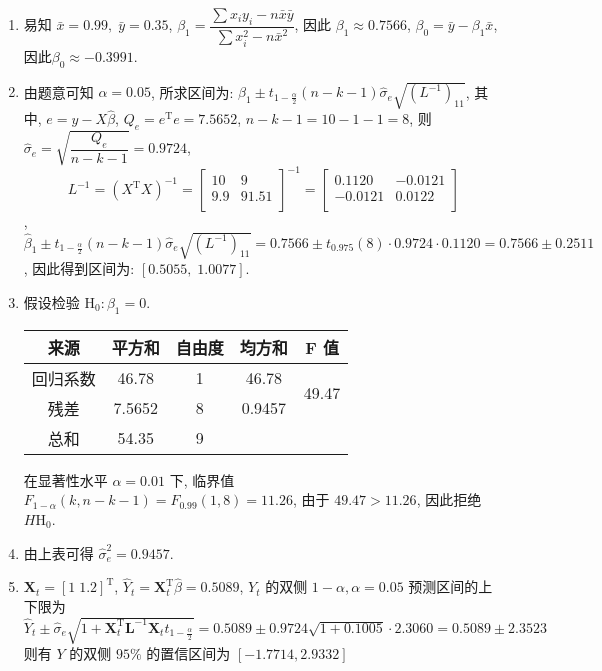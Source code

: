 \begin{enumerate}[(1)]
    \item 易知 $\bar{x}=0.99,\;\bar{y}=0.35$, $\beta_1=\dfrac{\sum x_iy_i-n\bar{x}\bar{y}}{\sum x_i^2-n\bar{x}^2}$, 因此 $\beta_1\approx 0.7566$, $\beta_0=\bar{y}-\beta_1\bar{x}$, 因此$\beta_0\approx -0.3991$.
    
    \item 由题意可知 $\alpha=0.05$, 所求区间为: $\beta_1\pm t_{1-\frac{\alpha}{2}}(n-k-1)\hat{\sigma}_e\sqrt{(L^{-1})_{11}}$, 其中, $e=y-X\hat{\beta}$, $Q_e=e^{\text{T}}e=7.5652$, $n-k-1=10-1-1=8$, 则 $\hat{\sigma}_{e}=\sqrt{\dfrac{Q_e}{n-k-1}}=0.9724$,
    $$
    L^{-1}=(X^{\text{T}}X)^{-1}=\begin{bmatrix}
        10&9\\
        9.9&91.51\\
    \end{bmatrix}^{-1}=\begin{bmatrix}
        0.1120&-0.0121\\
        -0.0121&0.0122\\
    \end{bmatrix}
    $$, $\hat{\beta}_1\pm t_{1-\frac{\alpha}{2}}(n-k-1)\hat{\sigma}_e\sqrt{(L^{-1})_{11}}=0.7566\pm t_{0.975}(8)\cdot 0.9724\cdot 0.1120=0.7566\pm0.2511$,
    因此得到区间为: $[0.5055,\;1.0077]$.
    \item 假设检验 $\text{H}_0:\beta_1=0$.
    
    \begin{center}
    \begin{tabular}{c|c|c|cc}
        \hline
        来源&平方和& 自由度 & \multicolumn{1}{c|}{均方和}   & F 值\\ \hline
        回归系数 & 46.78  & 1   & \multicolumn{1}{c|}{46.78}  & \multirow{2}{*}{49.47} \\
        残差   & 7.5652 & 8  & \multicolumn{1}{c|}{0.9457} &\\ \hline
        总和   & 54.35  & 9  &&\\ \hline
    \end{tabular}
    \end{center}

    在显著性水平 $\alpha=0.01$ 下, 临界值 $F_{1-\alpha}(k,n-k-1)=F_{0.99}(1,8)=11.26$, 由于 $49.47>11.26$, 因此拒绝 $H\text{H}_0$.
    \item 由上表可得 $\hat{\sigma}_e^2=0.9457$.
    \item $\textbf{X}_t=[1\;1.2]^{\text{T}}$, 
    $\hat{Y}_t=\textbf{X}^{\text{T}}_t\hat{\beta}=0.5089$,
    $Y_t$ 的双侧 $1-\alpha,\alpha=0.05$ 预测区间的上下限为
    $\hat{Y}_t\pm \hat{\sigma}_e\sqrt{1+\textbf{X}_t^{\text{T}}\textbf{L}^{-1}\textbf{X}_tt_{1-\frac{\alpha}{2}}}=0.5089\pm 0.9724\sqrt{1+0.1005}\cdot2.3060=0.5089\pm 2.3523$
    则有 $Y$ 的双侧 $95\%$ 的置信区间为 $[-1.7714, 2.9332]$
        
\end{enumerate}

